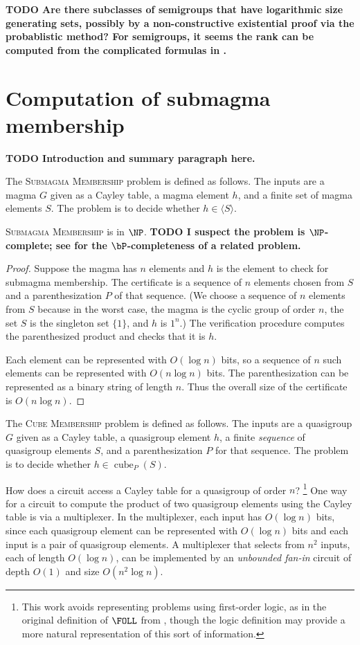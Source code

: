 \documentclass{article}
\newcommand{\todo}[1]{\textbf{TODO #1}}
\newcommand{\gen}[1]{\langle #1 \rangle}
\DeclareMathOperator{\cube}{cube}
\begin{document}
\todo{Are there subclasses of semigroups that have logarithmic size generating sets, possibly by a non-constructive existential proof via the probablistic method?
  For semigroups, it seems the rank can be computed from the complicated formulas in \autocite{gray14}.}

\section{Computation of submagma membership}

\todo{Introduction and summary paragraph here.}

The \textsc{Submagma Membership} problem is defined as follows.
The inputs are a magma $G$ given as a Cayley table, a magma element $h$, and a finite set of magma elements $S$.
The problem is to decide whether $h \in \gen{S}$.

\begin{lemma}
  \textsc{Submagma Membership} is in $\NP$.
  \todo{I suspect the problem is $\NP$-complete; see \autocite[Theorem~7]{py96} for the $\bP$-completeness of a related problem.}
\end{lemma}
\begin{proof}
  Suppose the magma has $n$ elements and $h$ is the element to check for submagma membership.
  The certificate is a sequence of $n$ elements chosen from $S$ and a parenthesization $P$ of that sequence.
  (We choose a sequence of $n$ elements from $S$ because in the worst case, the magma is the cyclic group of order $n$, the set $S$ is the singleton set $\{1\}$, and $h$ is $1^n$.)
  The verification procedure computes the parenthesized product and checks that it is $h$.

  Each element can be represented with $O(\log n)$ bits, so a sequence of $n$ such elements can be represented with $O(n \log n)$ bits.
  The parenthesization can be represented as a binary string of length $n$.
  Thus the overall size of the certificate is $O(n \log n)$.
\end{proof}

The \textsc{Cube Membership} problem is defined as follows.
The inputs are a quasigroup $G$ given as a Cayley table, a quasigroup element $h$, a finite \emph{sequence} of quasigroup elements $S$, and a parenthesization $P$ for that sequence.
The problem is to decide whether $h \in \cube_P(S)$.

How does a circuit access a Cayley table for a quasigroup of order $n$?
\footnote{This work avoids representing problems using first-order logic, as in the original definition of $\FOLL$ from \autocite{bklm01}, though the logic definition may provide a more natural representation of this sort of information.}
One way for a circuit to compute the product of two quasigroup elements using the Cayley table is via a multiplexer.
In the multiplexer, each input has $O(\log n)$ bits, since each quasigroup element can be represented with $O(\log n)$ bits and each input is a pair of quasigroup elements.
A multiplexer that selects from $n^2$ inputs, each of length $O(\log n)$, can be implemented by an \emph{unbounded fan-in} circuit of depth $O(1)$ and size $O(n^2 \log n)$.
\end{document}
